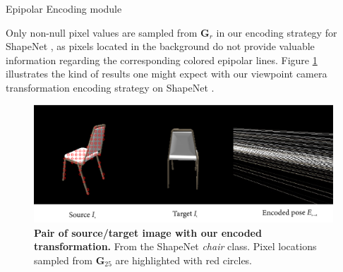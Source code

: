 \begin{algorithm}[h!]
    \caption{Epipolar Encoding module \label{alg:pseudoCode}}
    
    \medskip
    
\end{algorithm}

Only non-null pixel values are sampled from $\textbf{G}_{r}$ in our encoding strategy for ShapeNet \citep{chang2015shapenet}, as pixels located in the background do not provide valuable information regarding the corresponding colored epipolar lines. Figure \ref{fig:examplePoseEncoded} illustrates the kind of results one might expect with our viewpoint camera transformation encoding strategy on ShapeNet \citep{chang2015shapenet}. 


\begin{figure}[h!]
\begin{center}
\includegraphics[width=\textwidth]{images/epipolarnvs/EpipolarNVS_encoded.png}
\end{center}
\caption{\textbf{Pair of source/target image with our encoded transformation.} From the ShapeNet \citep{chang2015shapenet} \textit{chair} class. Pixel locations sampled from $\textbf{G}_{25}$ are highlighted with red circles.}
\label{fig:examplePoseEncoded}
\end{figure}


